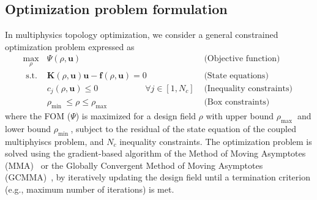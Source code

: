     \subsection*{Optimization problem formulation}
    In multiphysics topology optimization, we consider a general constrained optimization problem 
    expressed as
    \begin{equation}
        \begin{array}{clr}
            \max\limits_{\rho}                        & \Psi(\rho, \mathbf{u}) \quad \quad \quad \quad \,\,\,\, 
              & \text { (Objective function) }                                                         \\
            \text { s.t. }                            & \mathbf{K}(\rho, \mathbf{u})\mathbf{u} -\mathbf{f} (\rho, \mathbf{u})=0 \quad
                     & \text { (State equations) }                                                            \\
                                                      & c_j(\rho, \mathbf{u}) \leq 0 \quad \quad \quad \quad \quad  \,\,\, \forall j \in\left[1,
            N_c\right]                                & \text { (Inequality constraints) }                                                     \\
                                                      & \rho_{\text {min }} \leq \rho \leq \rho_{\text {max }}                  & \text { (Box
                constraints) }
        \end{array}
    \end{equation}
    where the FOM ($\Psi$) is maximized for a design field $\rho$ with upper
    bound $\rho_{\text {max }}$ and lower bound $\rho_{\text {min }}$,
    subject to the residual of the state equation of the coupled multiphyiscs problem, and
     $N_c$ inequality constraints. The optimization problem is solved using
    the gradient-based algorithm of the Method of Moving
    Asymptotes (MMA)~\cite{MMA} or the Globally Convergent Method of Moving Asymptotes
    (GCMMA)~\cite{GCMMA}, by iteratively updating the design field until a
    termination criterion (e.g., maximum number of iterations) is met.

